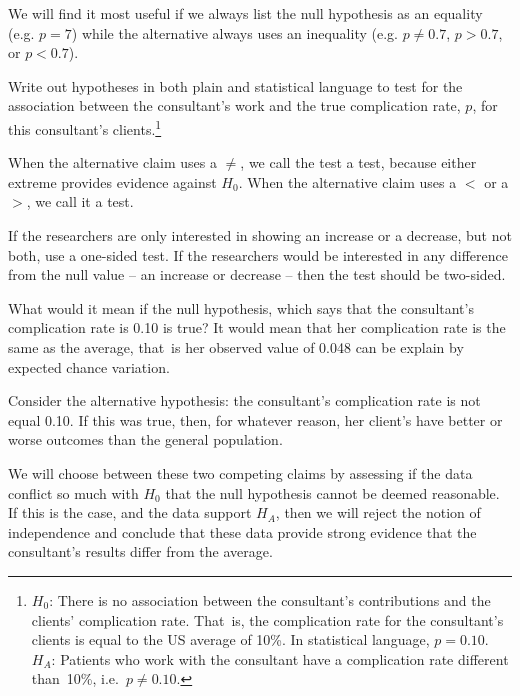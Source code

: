 \begin{tipBox}{
We will find it most useful if we always list the null hypothesis as an equality (e.g. $p = 7$) while the alternative always uses an inequality (e.g. $p \neq 0.7$, $p>0.7$, or $p<0.7$).}
\end{tipBox}


\begin{exercise}\label{hypForAssessingConsultantWorkInLiverTransplants}
Write out hypotheses in both plain and statistical language to test for the association between the consultant's work and the true complication rate, $p$, for this consultant's clients.\footnote{$H_0$: There is no association between the consultant's contributions and the clients' complication rate. That~is, the complication rate for the consultant's clients is equal to the US average of 10\%. In statistical language, $p=0.10$. $H_A$: Patients who work with the consultant have a complication rate different than~10\%, i.e.~$p \neq 0.10$.}
\end{exercise}

When the alternative claim uses a $\neq$, we call the test a  test, because either extreme provides evidence against $H_0$.  When the alternative claim uses a $<$ or a $>$, we call it a  test.
  
\begin{tipBox}{
If the researchers are only interested in showing an increase or a decrease, but not both, use a one-sided test. If the researchers would be interested in any difference from the null value -- an increase or decrease -- then the test should be two-sided.\vspace{0.5mm}}
\end{tipBox}

What would it mean if the null hypothesis, which says that the consultant's complication rate is 0.10 is true? It would mean that her complication rate is the same as the average, that~is her observed value of 0.048 can be explain by expected chance variation.  

Consider the alternative hypothesis: the consultant's complication rate is not equal 0.10.  If this was true, then, for whatever reason, her client's have better or worse outcomes than the general population.  

We will choose between these two competing claims by assessing if the data conflict so much with $H_0$ that the null hypothesis cannot be deemed reasonable. If this is the case, and the data support $H_A$, then we will reject the notion of independence and conclude that these data provide strong evidence that the consultant's results differ from the average.

